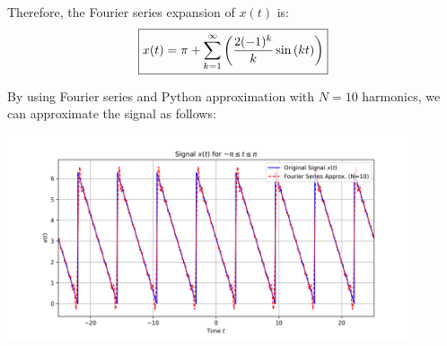 \documentclass[a4paper, 10pt]{article}
\begin{document}
\begin{tosubmit}
\newpage

Therefore, the Fourier series expansion of \( x(t) \) is:
\[ \boxed{ x(t) = \pi + \sum_{k=1}^{\infty} \left( \frac{2(-1)^k}{k} \sin{(k t)} \right) } \]

By using Fourier series and Python approximation with \( N = 10 \) harmonics, we can approximate the signal as follows:
\begin{center}
    \includegraphics[width=0.9\textwidth]{images/problem_2_2.png}
\end{center}
\end{tosubmit}
\end{document}
